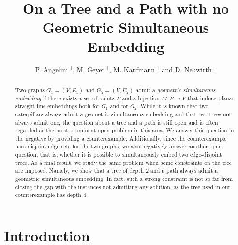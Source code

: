 \documentclass[a4paper,10pt]{llncs}
\begin{document}
\title{On a Tree and a Path with no Geometric Simultaneous Embedding}

\author{P. Angelini $^\dag$, M. Geyer $^\ddag$,  M. Kaufmann $^\ddag$ and D. Neuwirth $^\ddag$}




\maketitle              






\begin{abstract}
Two graphs $G_1=(V,E_1)$ and $G_2=(V,E_2)$ admit a \emph{geometric simultaneous embedding} if there exists a set of points $P$ and a bijection $M: P \rightarrow V$ that induce planar straight-line embeddings both for $G_1$ and for $G_2$. While it is known that two caterpillars always admit a geometric simultaneous embedding and that two trees not always admit one, the question about a tree and a path is still open and is often regarded as the most prominent open problem in this area. We answer this question in the negative by providing a counterexample. Additionally, since the counterexample uses disjoint edge sets for the two graphs, we also negatively answer another open question, that is, whether it is possible to simultaneously embed two edge-disjoint trees. As a final result, we study the same problem when some constraints on the tree are imposed. Namely, we show that a tree of depth $2$ and a path always admit a geometric simultaneous embedding. In fact, such a strong constraint is not so far from closing the gap with the instances not admitting any solution, as the tree used in our counterexample has depth $4$.
\end{abstract}



\section{Introduction}
\end{document}
